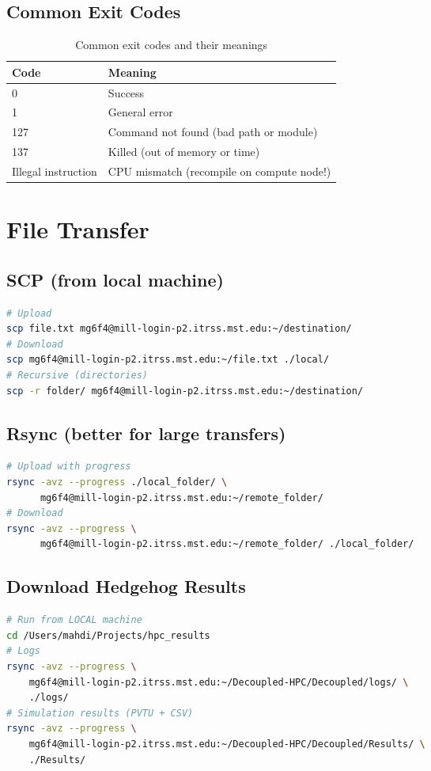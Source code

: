 \documentclass[11pt,a4paper]{article}
\begin{document}
\subsection{Common Exit Codes}
\begin{table}[h]
\centering
\begin{tabular}{@{}ll@{}}
\toprule
\textbf{Code} & \textbf{Meaning} \\
\midrule
0 & Success \\
1 & General error \\
127 & Command not found (bad path or module) \\
137 & Killed (out of memory or time) \\
Illegal instruction & CPU mismatch (recompile on compute node!) \\
\bottomrule
\end{tabular}
\caption{Common exit codes and their meanings}
\end{table}
\section{File Transfer}
\subsection{SCP (from local machine)}
\begin{lstlisting}[language=bash]
# Upload
scp file.txt mg6f4@mill-login-p2.itrss.mst.edu:~/destination/
# Download
scp mg6f4@mill-login-p2.itrss.mst.edu:~/file.txt ./local/
# Recursive (directories)
scp -r folder/ mg6f4@mill-login-p2.itrss.mst.edu:~/destination/
\end{lstlisting}
\subsection{Rsync (better for large transfers)}
\begin{lstlisting}[language=bash]
# Upload with progress
rsync -avz --progress ./local_folder/ \
      mg6f4@mill-login-p2.itrss.mst.edu:~/remote_folder/
# Download
rsync -avz --progress \
      mg6f4@mill-login-p2.itrss.mst.edu:~/remote_folder/ ./local_folder/
\end{lstlisting}
\subsection{Download Hedgehog Results}
\begin{lstlisting}[language=bash]
# Run from LOCAL machine
cd /Users/mahdi/Projects/hpc_results
# Logs
rsync -avz --progress \
    mg6f4@mill-login-p2.itrss.mst.edu:~/Decoupled-HPC/Decoupled/logs/ \
    ./logs/
# Simulation results (PVTU + CSV)
rsync -avz --progress \
    mg6f4@mill-login-p2.itrss.mst.edu:~/Decoupled-HPC/Decoupled/Results/ \
    ./Results/
\end{lstlisting}
\end{document}
